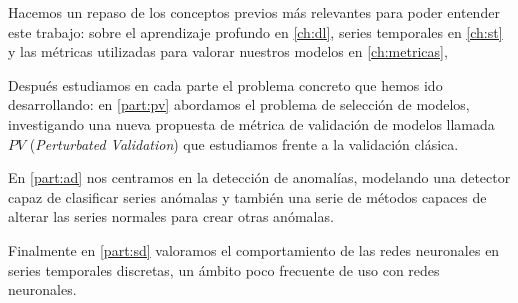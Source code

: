 Hacemos un repaso de los conceptos previos más relevantes para poder entender este trabajo: sobre el aprendizaje profundo en \autoref{ch:dl}, series temporales en \autoref{ch:st} y las métricas utilizadas para valorar nuestros modelos en \autoref{ch:metricas},

Después estudiamos en cada parte el problema concreto que hemos ido desarrollando: en \autoref{part:pv} abordamos el problema de selección de modelos, investigando una nueva propuesta de métrica de validación de modelos llamada $PV$ (\emph{Perturbated Validation}) que estudiamos frente a la validación clásica.

En \autoref{part:ad} nos centramos en la detección de anomalías, modelando una detector capaz de clasificar series anómalas y también una serie de métodos capaces de alterar las series normales para crear otras anómalas.

Finalmente en \autoref{part:sd} valoramos el comportamiento de las redes neuronales en series temporales discretas, un ámbito poco frecuente de uso con redes neuronales.

\endinput
